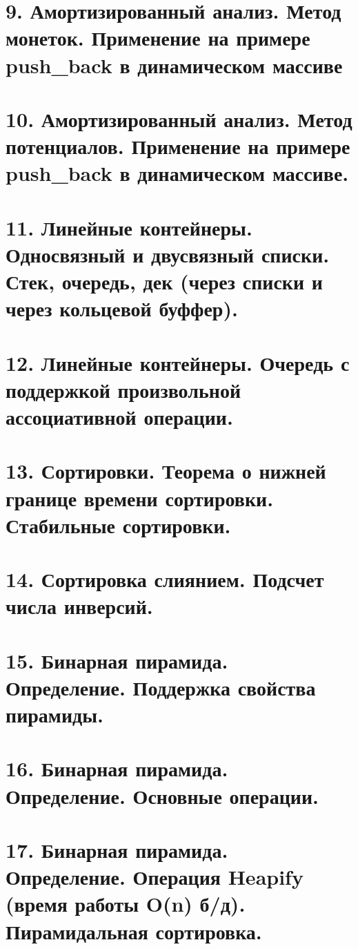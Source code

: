 \section{9. Амортизированный анализ. Метод монеток. Применение на примере push\_back в динамическом массиве}


\section{10. Амортизированный анализ. Метод потенциалов. Применение на примере push\_back в динамическом массиве.}


\section{11. Линейные контейнеры. Односвязный и двусвязный списки. Стек, очередь, дек (через списки и
через кольцевой буффер).}


\section{12. Линейные контейнеры. Очередь с поддержкой произвольной ассоциативной операции.}


\section{13. Сортировки. Теорема о нижней границе времени сортировки. Стабильные сортировки.}


\section{14. Сортировка слиянием. Подсчет числа инверсий.}


\section{15. Бинарная пирамида. Определение. Поддержка свойства пирамиды.}


\section{16. Бинарная пирамида. Определение. Основные операции.}


\section{17. Бинарная пирамида. Определение. Операция Heapify (время работы O(n) б/д). Пирамидальная сортировка.}


